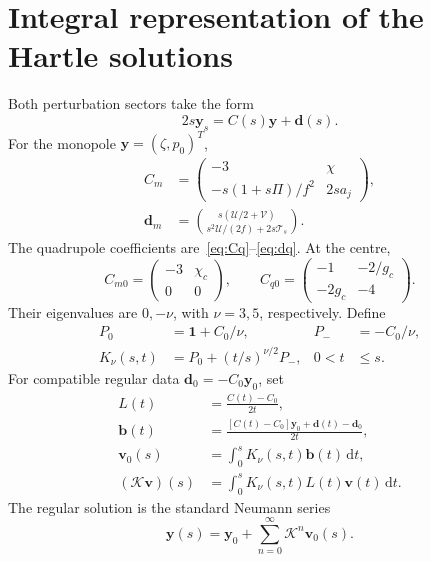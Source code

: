 \documentclass[journal,a4paper]{IEEEtran}
\newcommand{\dd}{\mathrm d}
\begin{document}
\section{Integral representation of the Hartle solutions}
\label{app:volterra}
Both perturbation sectors take the form
\begin{equation}
 2s\boldsymbol y_s=C(s)\boldsymbol y+\boldsymbol d(s).
\end{equation}
For the monopole $\boldsymbol y=(\zeta,p_0)^T$,
\begin{align}
 C_m&=\begin{pmatrix}-3&\chi\\-s(1+s\Pi)/f^2&2sa_j\end{pmatrix},\nonumber\\
 \boldsymbol d_m&=\binom{s(\mathcal U/2+\mathcal V)}
 {s^2\mathcal U/(2f)+2s\mathcal T_s}.
\end{align}
The quadrupole coefficients are~\eqref{eq:Cq}--\eqref{eq:dq}. At the centre,
\begin{equation}
 C_{m0}=\begin{pmatrix}-3&\chi_c\\0&0\end{pmatrix},\qquad
 C_{q0}=\begin{pmatrix}-1&-2/g_c\\-2g_c&-4\end{pmatrix}.
\end{equation}
Their eigenvalues are $0,-\nu$, with $\nu=3,5$, respectively. Define
\begin{align}
 P_0&=\mathbf1+C_0/\nu,&P_-&=-C_0/\nu,\nonumber\\
 K_\nu(s,t)&=P_0+(t/s)^{\nu/2}P_-,&0<t&\le s.
\end{align}
For compatible regular data $\boldsymbol d_0=-C_0\boldsymbol y_0$, set
\begin{align}
 L(t)&=\frac{C(t)-C_0}{2t},\nonumber\\
 \boldsymbol b(t)&=\frac{[C(t)-C_0]\boldsymbol y_0+
                     \boldsymbol d(t)-\boldsymbol d_0}{2t},\nonumber\\
 \boldsymbol v_0(s)&=\int_0^sK_\nu(s,t)\boldsymbol b(t)\,\dd t,\nonumber\\
 (\mathcal K\boldsymbol v)(s)&=\int_0^sK_\nu(s,t)L(t)\boldsymbol v(t)\,\dd t.
\end{align}
The regular solution is the standard Neumann series
\begin{equation}
 \boldsymbol y(s)=\boldsymbol y_0+
                    \sum_{n=0}^{\infty}\mathcal K^n\boldsymbol v_0(s).
 \label{eq:volterra}
\end{equation}
\end{document}
